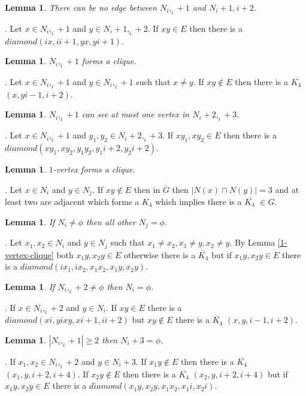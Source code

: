 \documentclass[12pt]{article}
\newtheorem{Lemma}[Theorem]{Lemma}
\begin{document}
\begin{Lemma}\label{lem:2-vertex-neighbor}
There can be no edge between $N_i,_i+1$ and $N_i+1,i+2$.
\end{Lemma}
. Let $x \in N_i,_i+1$ and $y \in N_i+1,_i+2$. If $xy \in E$ then there is a $diamond (ix,ii+1,yx,yi+1)$.

\begin{Lemma}\label{lem:2-vertex-clique}
$N_i,_i+1$ forms a clique.
\end{Lemma}
. Let $x \in N_i,_i+1$ and $y \in N_i,_i+1$ such that $x \neq y$. If $xy \not \in E$ then there is a $\overline{K_4}$ $(x, y i-1, i+2)$.

\begin{Lemma}\label{lem:2-vertex-max-neightbours}
$N_i,_i+1$ can see at most one vertex in $N_i+2,_i+3$.
\end{Lemma}
. Let $x \in N_i,_i+1$ and $y_1,y_2 \in N_i+2,_i+3$. If $xy_1, xy_2 \in E$ then there is a $diamond (xy_1, xy_2, y_1y_2, y_1i+2,y_2i+2)$.

\begin{Lemma}\label{lem:1-vertex-clique}
$1$-vertex forms a clique.
\end{Lemma}
. Let $x \in N_i$ and $y \in N_j$. If $xy \not \in E$ then in $\overline{G}$ then $|N(x) \cap N(y)| = 3$ and at least two are adjacent which forms a $K_4$ which implies there is a  $\overline{K_4}$ $\in G$.

\begin{Lemma}\label{lem:1-vertex-set-limit} 
If $N_i \neq \phi$ then all other $N_j = \phi$.
\end{Lemma}
. Let $x_1, x_2 \in N_i$ and $y \in N_j$ such that $x_1 \neq x_2, x_1 \neq y, x_2 \neq y$. By Lemma \ref{1-vertex-clique} both $x_1y,x_2y \in E$ otherwise there is a $\overline{K_4}$ but if $x_1y,x_2y \in E$ there is a $diamond (ix_1,ix_2, x_1x_2,x_1y,x_2y)$.

\begin{Lemma}\label{lem:1-vertex-cross-sea-2-vertex}
If $N_i,_i+2 \neq \phi$ then $N_i = \phi$.
\end{Lemma}
. If $x \in N_i,_i+2$ and $y \in N_i$. If $xy \in E$ there is a $diamond (xi,yi xy, xi+1,ii+2)$ but $xy \not \in E$ there is a $\overline{K_4}$ $(x, y, i-1, i+2)$.

\begin{Lemma}\label{lem:1-vertex-cross-sea-2-vertex}
$|N_i,_i+1| \geq 2$ then $N_i+3 = \phi$.
\end{Lemma}
. If $x_1,x_2 \in N_i,_i+2$ and $y \in N_i+3$. If $x_1y \not \in E$ then there is a $\overline{K_4}$ $(x_1,y,i+2, i+4)$. If $x_2y \not \in E$ then there is a $\overline{K_4}$ $(x_2,y,i+2, i+4)$ but if $x_1y, x_2y \in E$ there is a $diamond (x_1y,x_2y,x_1x_2,x_1i,x_2i)$.
\end{document}
